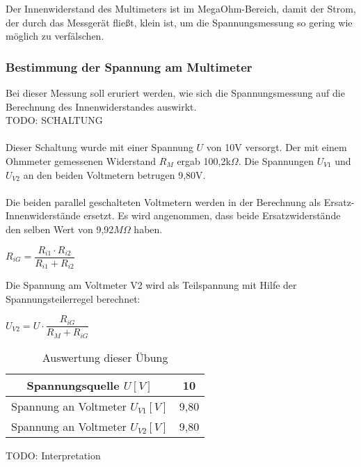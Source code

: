Der Innenwiderstand des Multimeters ist im MegaOhm-Bereich, damit der Strom, der durch das Messgerät fließt, klein ist, um die Spannungsmessung so gering wie möglich zu verfälschen.

\subsubsection{Bestimmung der Spannung am Multimeter}
Bei dieser Messung soll eruriert werden, wie sich die Spannungsmessung auf die Berechnung des Innenwiderstandes auswirkt.
~\\
TODO: SCHALTUNG		\\
~\\
Dieser Schaltung wurde mit einer Spannung $U$ von 10V versorgt. Der mit einem Ohmmeter gemessenen Widerstand $R_M$ ergab 100,2k$\Omega$. Die Spannungen $U_{V1}$ und $U_{V2}$ an den beiden Voltmetern betrugen 9,80V.	\\
~\\
Die beiden parallel geschalteten Voltmetern werden in der Berechnung als Ersatz-Innenwiderstände ersetzt. Es wird angenommen, dass beide Ersatzwiderstände den selben Wert von 9,92$M\Omega$ haben.
\begin{center}
$R_{iG} = \dfrac{R_{i1} \cdot R_{i2}}{R_{i1} + R_{i2}}$
\end{center}
Die Spannung am Voltmeter V2 wird als Teilspannung mit Hilfe der Spannungsteilerregel berechnet:
\begin{center}
$U_{V2} = U \cdot \dfrac{R_{iG}}{R_M + R_{iG}}$
\end{center}
\begin{table}[h]
	\centering
	\begin{tabular}{|c|c|}
	\hline 
	Spannungsquelle $U [V]$			& 10 		\\ 
	\hline 
	Spannung an Voltmeter $U_{V1} [V]$ 	& 9,80	\\ 
	\hline 
	Spannung an Voltmeter $U_{V2} [V]$ 	& 9,80	\\ 
	\hline 
	\end{tabular}
	\caption{Auswertung dieser Übung}
\end{table}
TODO: Interpretation

